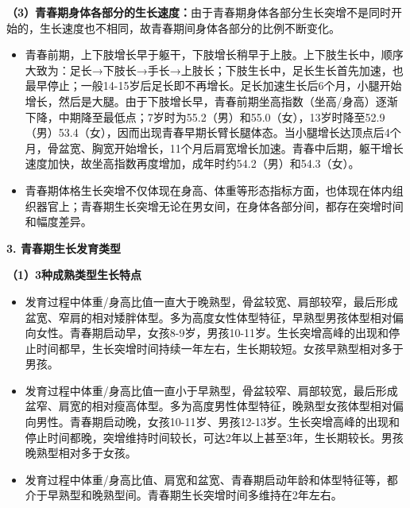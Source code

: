 \begin{keybox}
\textbf{（3）青春期身体各部分的生长速度：}由于青春期身体各部分生长突增不是同时开始的，生长速度也不相同，故青春期间身体各部分的比例不断变化。
\begin{itemize}[leftmargin=*]
    \item 青春前期，上下肢增长早于躯干，下肢增长稍早于上肢。上下肢生长中，顺序大致为：足长→下肢长→手长→上肢长；下肢生长中，足长生长首先加速，也最早停止；一般14-15岁后足长即不再增长。足长加速生长后6个月，小腿开始增长，然后是大腿。由于下肢增长早，青春前期坐高指数（坐高/身高）逐渐下降，中期降至最低点；7岁时为55.2（男）和55.0（女），13岁时降至52.9（男）53.4（女），因而出现青春早期长臂长腿体态。当小腿增长达顶点后4个月，骨盆宽、胸宽开始增长，11个月后肩宽增长加速。青春中后期，躯干增长速度加快，故坐高指数再度增加，成年时约54.2（男）和54.3（女）。
\end{itemize}

\vspace{3pt}
\begin{center}
\end{center}
\vspace{3pt}

\begin{itemize}[leftmargin=*]
    \item 青春期体格生长突增不仅体现在身高、体重等形态指标方面，也体现在体内组织器官上；青春期生长突增无论在男女间，在身体各部分间，都存在突增时间和幅度差异。
\end{itemize}

\textbf{3. 青春期生长发育类型}

\textbf{（1）3种成熟类型生长特点}
\begin{itemize}[leftmargin=*]
    \item {}发育过程中体重/身高比值一直大于晚熟型，骨盆较宽、肩部较窄，最后形成盆宽、窄肩的相对矮胖体型。多为高度女性体型特征，早熟型男孩体型相对偏向女性。青春期启动早，女孩8-9岁，男孩10-11岁。生长突增高峰的出现和停止时间都早，生长突增时间持续一年左右，生长期较短。女孩早熟型相对多于男孩。
    \item {}发育过程中体重/身高比值一直小于早熟型，骨盆较窄、肩部较宽，最后形成盆窄、肩宽的相对瘦高体型。多为高度男性体型特征，晚熟型女孩体型相对偏向男性。青春期启动晚，女孩10-11岁、男孩12-13岁。生长突增高峰的出现和停止时间都晚，突增维持时间较长，可达2年以上甚至3年，生长期较长。男孩晚熟型相对多于女孩。
    \item {}发育过程中体重/身高比值、肩宽和盆宽、青春期启动年龄和体型特征等，都介于早熟型和晚熟型间。青春期生长突增时间多维持在2年左右。
\end{itemize}


\end{keybox}
